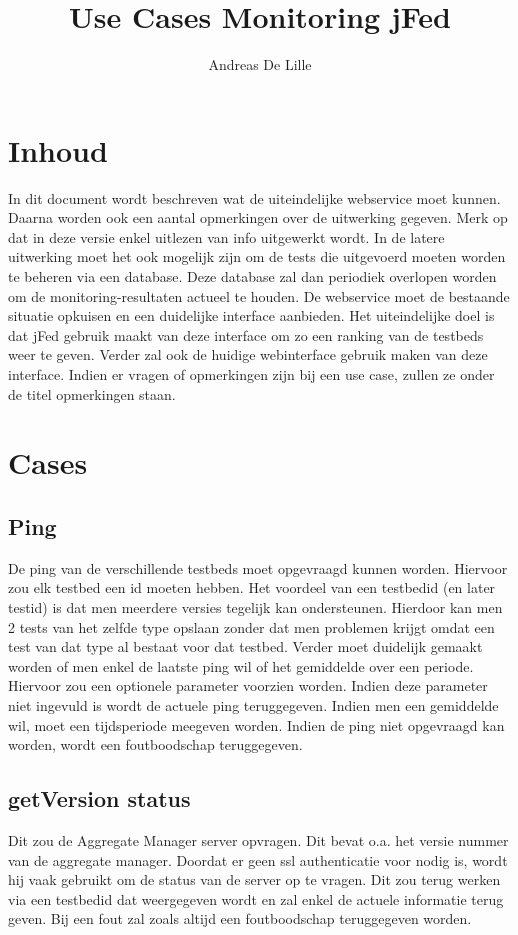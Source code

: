 \documentclass[11pt]{article}
\begin{document}
\title{Use Cases Monitoring jFed}
\author{Andreas De Lille}
\maketitle

\section{Inhoud}
In dit document wordt beschreven wat de uiteindelijke webservice moet kunnen. Daarna worden ook een aantal opmerkingen over de uitwerking gegeven. Merk op dat in deze versie enkel uitlezen van info uitgewerkt wordt. In de latere uitwerking moet het ook mogelijk zijn om de tests die uitgevoerd moeten worden te beheren via een database.
Deze database zal dan periodiek overlopen worden om de monitoring-resultaten actueel te houden.
De webservice moet de bestaande situatie opkuisen en een duidelijke interface aanbieden. Het uiteindelijke doel is dat jFed gebruik maakt van deze interface om zo een ranking van de testbeds weer te geven. Verder zal ook de huidige webinterface gebruik maken van deze interface. Indien er vragen of opmerkingen zijn bij een use case, zullen ze onder de titel opmerkingen staan.

\section{Cases}
\subsection{Ping}
De ping van de verschillende testbeds moet opgevraagd kunnen worden.
Hiervoor zou elk testbed een id moeten hebben. Het voordeel van een testbedid (en later testid) is dat men meerdere versies tegelijk kan ondersteunen. Hierdoor kan men 2 tests van het zelfde type opslaan zonder dat men problemen krijgt omdat een test van dat type al bestaat voor dat testbed. Verder moet duidelijk gemaakt worden of men enkel de laatste ping wil of het gemiddelde over een periode. Hiervoor zou een optionele parameter voorzien worden. Indien deze parameter niet ingevuld is wordt de actuele ping teruggegeven. Indien men een gemiddelde wil, moet een tijdsperiode meegeven worden. Indien de ping niet opgevraagd kan worden, wordt een foutboodschap teruggegeven.

\subsection{getVersion status}
Dit zou de Aggregate Manager server opvragen. Dit bevat o.a. het versie nummer van de aggregate manager.
Doordat er geen ssl authenticatie voor nodig is, wordt hij vaak gebruikt om de status van de server op te vragen.
Dit zou terug werken via een testbedid dat weergegeven wordt en zal enkel de actuele informatie 
terug geven. Bij een fout zal zoals altijd een foutboodschap teruggegeven worden.
\end{document}
